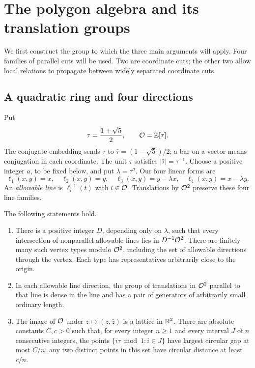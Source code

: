 \section{The polygon algebra and its translation groups}\label{sec:geometry}

We first construct the group to which the three main arguments will apply.
Four families of parallel cuts will be used. Two are coordinate cuts; the
other two allow local relations to propagate between widely separated
coordinate cuts.

\subsection{A quadratic ring and four directions}

Put
\[
 \tau=\frac{1+\sqrt5}{2},\qquad \mathcal O=\mathbb Z[\tau].
\]
The conjugate embedding sends $\tau$ to $\bar\tau=(1-\sqrt5)/2$;
a bar on a vector means conjugation in each coordinate. The unit $\tau$
satisfies $|\bar\tau|=\tau^{-1}$. Choose a positive integer $a$, to be
fixed below, and put $\lambda=\tau^a$. Our four linear forms are
\begin{equation}\label{eq:four-forms}
 \ell_1(x,y)=x,\quad \ell_2(x,y)=y,\quad
 \ell_3(x,y)=y-\lambda x,\quad
 \ell_4(x,y)=x-\lambda y.
\end{equation}
An \emph{allowable line} is $\ell_i^{-1}(t)$ with $t\in\mathcal O$.
Translations by $\mathcal O^2$ preserve these four line families.

\begin{lemma}\label{lem:arithmetic}
The following statements hold.
\begin{enumerate}[label=\textup{(\roman*)}]
\item There is a positive integer $D$, depending only on $\lambda$, such
that every intersection of nonparallel allowable lines lies in
$D^{-1}\mathcal O^2$. There are finitely many such vertex types modulo
$\mathcal O^2$, including the set of allowable directions through the vertex.
Each type has representatives arbitrarily close to the origin.
\item In each allowable line direction, the group of translations in
$\mathcal O^2$ parallel to that line is dense in the line and has a pair of
generators of arbitrarily small ordinary length.
\item The image of $\mathcal O$ under $z\mapsto(z,\bar z)$ is a lattice in
$\mathbb R^2$. There are absolute constants $C,c>0$ such that, for every
integer $n\ge1$ and every interval $J$ of $n$ consecutive integers,
the points
$\{i\tau\bmod1:i\in J\}$ have largest circular gap at most $C/n$;
any two distinct points in this set have circular distance at least
$c/n$.
\end{enumerate}
\end{lemma}

